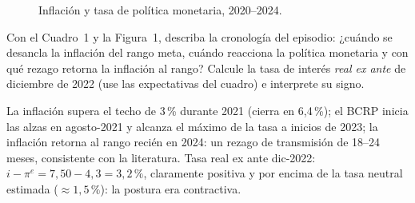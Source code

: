 \documentclass{academic-exam}
\begin{document}
\begin{figure}[h]
\centering
{}
\caption{Inflación y tasa de política monetaria, 2020--2024.}
\end{figure}

\begin{pregunta}
Con el Cuadro~1 y la Figura~1, describa la cronología del episodio:
¿cuándo se desancla la inflación del rango meta, cuándo reacciona la
política monetaria y con qué rezago retorna la inflación al rango?
Calcule la tasa de interés \emph{real ex ante} de diciembre de 2022
(use las expectativas del cuadro) e interprete su signo.
\begin{solucion}
La inflación supera el techo de 3\,\% durante 2021 (cierra en 6,4\,\%);
el BCRP inicia las alzas en agosto-2021 y alcanza el máximo de la tasa a
inicios de 2023; la inflación retorna al rango recién en 2024: un rezago
de transmisión de 18--24 meses, consistente con la literatura. Tasa real
ex ante dic-2022: $i - \pi^{e} = 7{,}50 - 4{,}3 = 3{,}2\,\%$, claramente
positiva y por encima de la tasa neutral estimada ($\approx 1{,}5\,\%$):
la postura era contractiva.
\end{solucion}
\end{pregunta}
\end{document}
